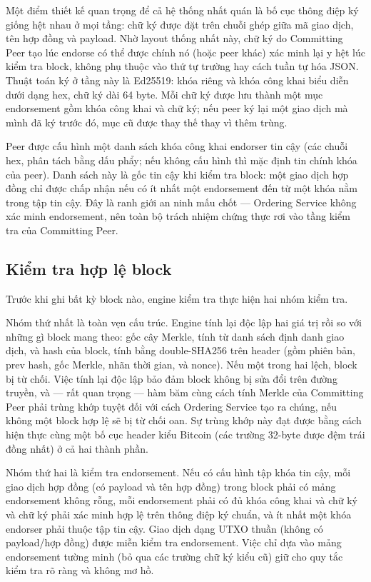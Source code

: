 Một điểm thiết kế quan trọng để cả hệ thống nhất quán là bố cục thông điệp ký
giống hệt nhau ở mọi tầng: chữ ký được đặt trên chuỗi ghép giữa mã giao dịch,
tên hợp đồng và payload. Nhờ layout thống nhất này, chữ ký do Committing Peer
tạo lúc endorse có thể được chính nó (hoặc peer khác) xác minh lại y hệt lúc
kiểm tra block, không phụ thuộc vào thứ tự trường hay cách tuần tự hóa JSON.
Thuật toán ký ở tầng này là Ed25519: khóa riêng và khóa công khai biểu diễn
dưới dạng hex, chữ ký dài 64 byte. Mỗi chữ ký được lưu thành một mục
endorsement gồm khóa công khai và chữ ký; nếu peer ký lại một giao dịch mà
mình đã ký trước đó, mục cũ được thay thế thay vì thêm trùng.

Peer được cấu hình một danh sách khóa công khai endorser tin cậy (các chuỗi
hex, phân tách bằng dấu phẩy; nếu không cấu hình thì mặc định tin chính khóa
của peer). Danh sách này là gốc tin cậy khi kiểm tra block: một giao dịch hợp
đồng chỉ được chấp nhận nếu có ít nhất một endorsement đến từ một khóa nằm
trong tập tin cậy. Đây là ranh giới an ninh mấu chốt --- Ordering Service
không xác minh endorsement, nên toàn bộ trách nhiệm chứng thực rơi vào tầng
kiểm tra của Committing Peer.

\subsection{Kiểm tra hợp lệ block}
\label{sec:validation}

Trước khi ghi bất kỳ block nào, engine kiểm tra thực hiện hai nhóm kiểm tra.

Nhóm thứ nhất là toàn vẹn cấu trúc. Engine tính lại độc lập hai giá trị rồi
so với những gì block mang theo: gốc cây Merkle, tính từ danh sách định danh
giao dịch, và hash của block, tính bằng double-SHA256 trên header (gồm phiên
bản, prev hash, gốc Merkle, nhãn thời gian, và nonce). Nếu một trong hai
lệch, block bị từ chối. Việc tính lại độc lập bảo đảm block không bị sửa đổi
trên đường truyền, và --- rất quan trọng --- hàm băm cùng cách tính Merkle
của Committing Peer phải trùng khớp tuyệt đối với cách Ordering Service tạo
ra chúng, nếu không một block hợp lệ sẽ bị từ chối oan. Sự trùng khớp này đạt
được bằng cách hiện thực cùng một bố cục header kiểu Bitcoin (các trường
32-byte được đệm trái đồng nhất) ở cả hai thành phần.

Nhóm thứ hai là kiểm tra endorsement. Nếu có cấu hình tập khóa tin cậy, mỗi
giao dịch hợp đồng (có payload và tên hợp đồng) trong block phải có mảng
endorsement không rỗng, mỗi endorsement phải có đủ khóa công khai và chữ ký
và chữ ký phải xác minh hợp lệ trên thông điệp ký chuẩn, và ít nhất một khóa
endorser phải thuộc tập tin cậy. Giao dịch dạng UTXO thuần (không có
payload/hợp đồng) được miễn kiểm tra endorsement. Việc chỉ dựa vào mảng
endorsement tường minh (bỏ qua các trường chữ ký kiểu cũ) giữ cho quy tắc
kiểm tra rõ ràng và không mơ hồ.

